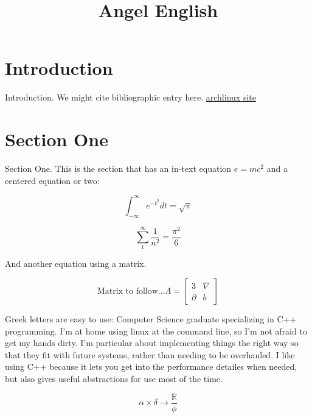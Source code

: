 \documentclass{amsart}
\title{Angel English}
\theoremstyle{definition} %
\begin{document}
\maketitle

\tableofcontents

\section{Introduction}

Introduction.  We might cite bibliographic entry \cite{SJE} here.
\href{https://www.archlinux.org}{archlinux site}

\section{Section One}

Section One.  This is the section that has an in-text equation
\(e=mc^2\) and a centered equation or two:

\begin{equation}
 \int_{-\infty}^\infty e^{-t^2}dt = \sqrt{\pi}
\end{equation}

\begin{equation*} %
 \sum_1^\infty \frac{1}{n^2} = \frac{\pi^2}{6}
\end{equation*}

And another equation using a matrix.

\begin{equation}
 \textrm{Matrix to follow\ldots }
 \Lambda =
 \begin{bmatrix}
   3        &  \nabla \\
   \partial &  b
 \end{bmatrix}
\end{equation}

Greek letters are easy to use:
Computer Science graduate specializing in C++ programming.
I'm at home using linux at the command line, so I'm not afraid to get
my hands dirty. I'm particular about implementing things the right
way so that they fit with future systems, rather than needing to be
overhauled. I like using C++ because it lets you get into the
performance detailes when needed, but also gives useful abstractions
for use most of the time.

\begin{equation}
 \alpha \times \delta \rightarrow \frac{\mathbb R}{\phi}
\end{equation}
\end{document}

